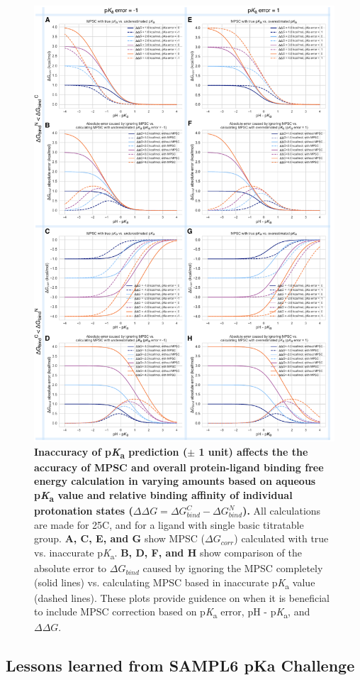 \documentclass[9pt,lineno,final]{elife}
\newcommand{\pKa}{p\textit{K}\textsubscript{a}}
\begin{document}
\begin{figure}
\centering
\includegraphics[width=0.8\linewidth]{figures/pKa-inaccuracy-and-MPSC.pdf}
\caption{ {\bf Inaccuracy of \pKa{} prediction ($\pm$ 1 unit) affects the the accuracy of MPSC and overall protein-ligand binding free energy calculation in varying amounts based on aqueous \pKa{} value and relative binding affinity of individual protonation states ($\Delta\Delta G = \Delta G_{bind}^{C} - \Delta G_{bind}^{N}$).} 
All calculations are made for 25\degree C, and for a ligand with single basic titratable group. {\bf A, C, E, and G} show MPSC ($\Delta G_{corr}$) calculated with true vs. inaccurate \pKa{}. {\bf B, D, F, and H} show comparison of the absolute error to $\Delta G_{bind}$ caused by ignoring the MPSC completely (solid lines) vs. calculating MPSC based in inaccurate \pKa{} value (dashed lines). These plots provide guidence on when it is beneficial to include MPSC correction based on \pKa{} error, pH - \pKa{}, and $\Delta\Delta G$. 
}
\label{fig:pKa-inaccuracy-and-MPSC}
\end{figure}



\subsection{Lessons learned from SAMPL6 pKa Challenge}
\end{document}
